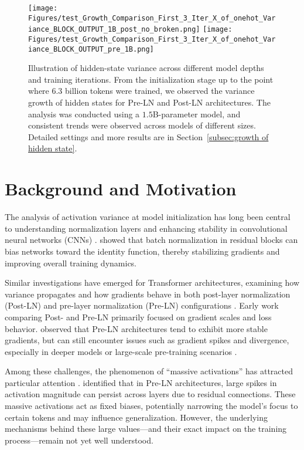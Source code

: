 
\begin{figure}[t]
\vskip -0.1in
    \centering
    \texttt{[image: Figures/test\_Growth\_Comparison\_First\_3\_Iter\_X\_of\_onehot\_Variance\_BLOCK\_OUTPUT\_1B\_post\_no\_broken.png]} \texttt{[image: Figures/test\_Growth\_Comparison\_First\_3\_Iter\_X\_of\_onehot\_Variance\_BLOCK\_OUTPUT\_pre\_1B.png]} 
    \vskip -0.05in
    \caption{Illustration of hidden-state variance across different model depths and training iterations. From the initialization stage up to the point where 6.3 billion tokens were trained, we observed the variance growth of hidden states for Pre-LN and Post-LN architectures. The analysis was conducted using a $1.5$B-parameter model, and consistent trends were observed across models of different sizes. Detailed settings and more results are in Section~\ref{subsec:growth of hidden state}.}
    \label{fig:3iter}
    \vskip -0.1in
\end{figure}

\section{Background and Motivation}
The analysis of activation variance at model initialization has long been central to understanding normalization layers and enhancing stability in convolutional neural networks (CNNs) \citep{cnnvariance, identity, BrockDSS21}. \citet{cnnvariance} showed that batch normalization in residual blocks can bias networks toward the identity function, thereby stabilizing gradients and improving overall training dynamics. 

Similar investigations have emerged for Transformer architectures, examining how variance propagates and how gradients behave in both post-layer normalization (Post-LN) \citep{attentionisallyouneed} and pre-layer normalization (Pre-LN) \citep{llama3} configurations \citep{onlayer, transformersgetstable, smallproxies, mixln}. Early work comparing Post- and Pre-LN primarily focused on gradient scales and loss behavior. \citet{onlayer} observed that Pre-LN architectures tend to exhibit more stable gradients, but can still encounter issues such as gradient spikes and divergence, especially in deeper models or large-scale pre-training scenarios \citep{attentioncollapse, smallproxies, mlpswiglu, embeddingln}. 

Among these challenges, the phenomenon of ``massive activations'' has attracted particular attention \citep{llm.int8,yu2024super,mlpswiglu}. \citet{massiveactivation} identified that in Pre-LN architectures, large spikes in activation magnitude can persist across layers due to residual connections. These massive activations act as fixed biases, potentially narrowing the model’s focus to certain tokens and may influence generalization. However, the underlying mechanisms behind these large values—and their exact impact on the training process—remain not yet well understood.

